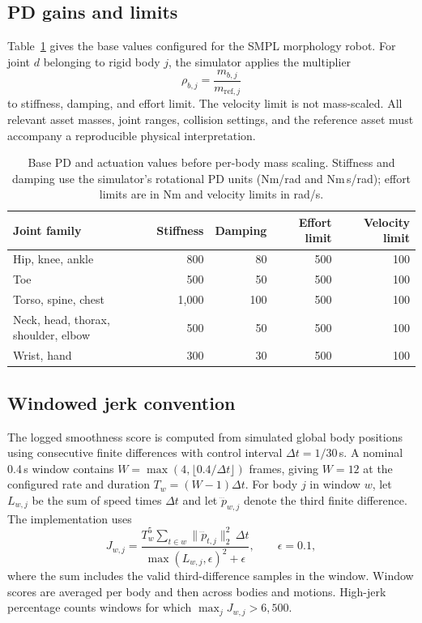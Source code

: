 \documentclass[11pt]{article}
\begin{document}
\subsection{PD gains and limits}\label{app:control}

Table~\ref{tab:pd_parameters} gives the base values configured for the
SMPL morphology robot. For joint $d$ belonging to rigid body $j$, the
simulator applies the multiplier
\begin{equation}
    \rho_{b,j} = \frac{m_{b,j}}{m_{\mathrm{ref},j}}
\end{equation}
to stiffness, damping, and effort limit. The velocity limit is not mass-scaled.
All relevant asset masses, joint ranges, collision settings, and the reference
asset must accompany a reproducible physical interpretation.

\begin{table}[htbp]
\centering
\small
\caption{Base PD and actuation values before per-body mass scaling.
Stiffness and damping use the simulator's rotational PD units
(Nm/rad and Nm\,s/rad); effort limits are in Nm and velocity limits in rad/s.}\label{tab:pd_parameters}
\begin{tabular}{lrrrr}
\toprule
Joint family & Stiffness & Damping & Effort limit & Velocity limit \\
\midrule
Hip, knee, ankle & 800 & 80 & 500 & 100 \\
Toe & 500 & 50 & 500 & 100 \\
Torso, spine, chest & 1,000 & 100 & 500 & 100 \\
Neck, head, thorax, shoulder, elbow & 500 & 50 & 500 & 100 \\
Wrist, hand & 300 & 30 & 500 & 100 \\
\bottomrule
\end{tabular}
\end{table}

\subsection{Windowed jerk convention}\label{app:smoothness}

The logged smoothness score is computed from simulated global body positions
using consecutive finite differences with control interval
$\Delta t=1/30$\,s. A nominal 0.4\,s window contains
$W=\max(4,\lfloor0.4/\Delta t\rfloor)$ frames, giving $W=12$ at the
configured rate and duration $T_w=(W-1)\Delta t$. For body $j$ in window $w$,
let $L_{w,j}$ be the sum of speed times $\Delta t$ and let
$\dddot{p}_{w,j}$ denote the third finite difference. The implementation uses
\begin{equation}
    J_{w,j} =
    \frac{T_w^5
      \sum_{t\in w}\|\dddot{p}_{t,j}\|_2^2\,\Delta t}
    {\max(L_{w,j},\epsilon)^2+\epsilon},
    \qquad \epsilon=0.1,
    \label{eq:jerk}
\end{equation}
where the sum includes the valid third-difference samples in the window.
Window scores are averaged per body and then across bodies and motions.
High-jerk percentage counts windows for which
$\max_j J_{w,j}>6{,}500$.
\end{document}
